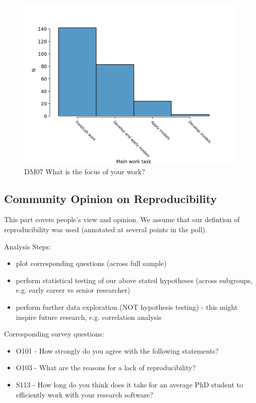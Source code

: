 \documentclass{article}
\begin{document}
\begin{figure}[!p]
    \centering
    \includegraphics[width=\textwidth]{../figs/DM07.png}
	\caption{DM07 What is the focus of your work?}
    \label{fig:dm07}
\end{figure}
\newpage

\subsection{Community Opinion on Reproducibility}
This part covers people's view and opinion.
We assume that our defintion of reproducibility was used (annotated at several points in the poll).

Analysis Steps:
\begin{itemize}
	\item plot corresponding questions (across full sample)
	\item perform statistical testing of our above stated hypotheses (across subgroups, e.g. early career vs senior researcher)
	\item perform further data exploration (NOT hypothesis testing) - this might inspire future research, e.g. correlation analysis
\end{itemize}
 
Corresponding survey questions:
\begin{itemize}
	\item O101 - How strongly do you agree with the following statements?
	\item O103 - What are the reasons for a lack of reproducibility?
	\item S113 - How long do you think does it take for an average PhD student to efficiently work with your research software?
\end{itemize}
\end{document}
